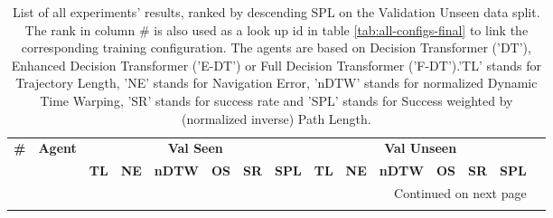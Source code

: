 \begin{longtable}{@{\hskip3pt}c@{\hskip3pt}c@{\hskip3pt}c@{\hskip3pt}c@{\hskip3pt}c@{\hskip3pt}c@{\hskip3pt}c@{\hskip3pt}c@{\hskip3pt}c@{\hskip3pt}c@{\hskip3pt}c@{\hskip3pt}c@{\hskip3pt}c@{\hskip3pt}c@{\hskip3pt}c}
\caption{List of all experiments' results, ranked by descending SPL on the Validation Unseen data split. The rank in column \# is also used as a look up id in table \ref{tab:all-configs-final} to link the corresponding training configuration. \newline The agents are based on Decision Transformer ('DT'), Enhanced Decision Transformer ('E-DT') or Full Decision Transformer ('F-DT').\newline 'TL' stands for Trajectory Length, 'NE' stands for Navigation Error, 'nDTW' stands for normalized Dynamic Time Warping, 'SR' stands for success rate and 'SPL' stands for  Success weighted by (normalized inverse) Path Length.}\\
\toprule
\textbf{\#} & \textbf{Agent} & \multicolumn{6}{c}{\textbf{Val Seen}} & \multicolumn{6}{c}{\textbf{Val Unseen}} \\
 \textbf{~} &     \textbf{~} &       \textbf{TL} & \textbf{NE} & \textbf{nDTW} & \textbf{OS} & \textbf{SR} & \textbf{SPL} &         \textbf{TL} & \textbf{NE} & \textbf{nDTW} & \textbf{OS} & \textbf{SR} & \textbf{SPL} \\
\midrule
\endhead
\midrule
\multicolumn{14}{r}{{Continued on next page}} \\
\midrule
\endfoot


\end{longtable}
